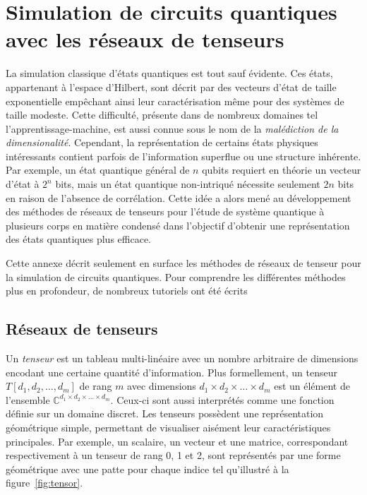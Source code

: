 \chapter{Simulation de circuits quantiques avec les réseaux de tenseurs}
\label{ann:simulation-circuits-quantiques-avec-reseaux-de-tenseurs}

La simulation classique d'états quantiques est tout sauf évidente. Ces états, appartenant à l'espace d'Hilbert, sont décrit par des vecteurs d'état de taille exponentielle empêchant ainsi leur caractérisation même pour des systèmes de taille modeste. Cette difficulté, présente dans de nombreux domaines tel l'apprentissage-machine, est aussi connue sous le nom de la \textit{malédiction de la dimensionalité}. Cependant, la représentation de certains états physiques intéressants contient parfois de l'information superflue ou une structure inhérente. Par exemple, un état quantique général de $n$ qubits requiert en théorie un vecteur d'état à $2^{n}$ bits, mais un état quantique non-intriqué nécessite seulement $2n$ bits en raison de l'absence de corrélation. Cette idée a alors mené au développement des méthodes de réseaux de tenseurs pour l'étude de système quantique à plusieurs corps en matière condensé dans l'objectif d'obtenir une représentation des états quantiques plus efficace. 

Cette annexe décrit seulement en surface les méthodes de réseaux de tenseur pour la simulation de circuits quantiques. Pour comprendre les différentes méthodes plus en profondeur, de nombreux tutoriels ont été écrits~\cite{bridgemanHandwavingInterpretiveDance2017a,biamonteTensorNetworksNutshell2017a,bakerMethodesCalculAvec2021a}


\section{Réseaux de tenseurs}


Un \textit{tenseur} est un tableau multi-linéaire avec un nombre arbitraire de dimensions encodant une certaine quantité d'information. Plus formellement, un tenseur $T[d_{1}, d_{2}, \dots, d_{m}]$ de rang $m$ avec dimensions $d_{1} \times d_{2} \times \dots \times d_{m}$ est un élément de l'ensemble $\mathbb{C}^{d_{1} \times d_{2} \times \dots \times d_{m}}$. Ceux-ci sont aussi interprétés comme une fonction définie sur un domaine discret. Les tenseurs possèdent une représentation géométrique simple, permettant de visualiser aisément leur caractéristiques principales. Par exemple, un scalaire, un vecteur et une matrice, correspondant respectivement à un tenseur de rang 0, 1 et 2, sont représentés par une forme géométrique avec une patte pour chaque indice tel qu'illustré à la figure~\ref{fig:tensor}.

